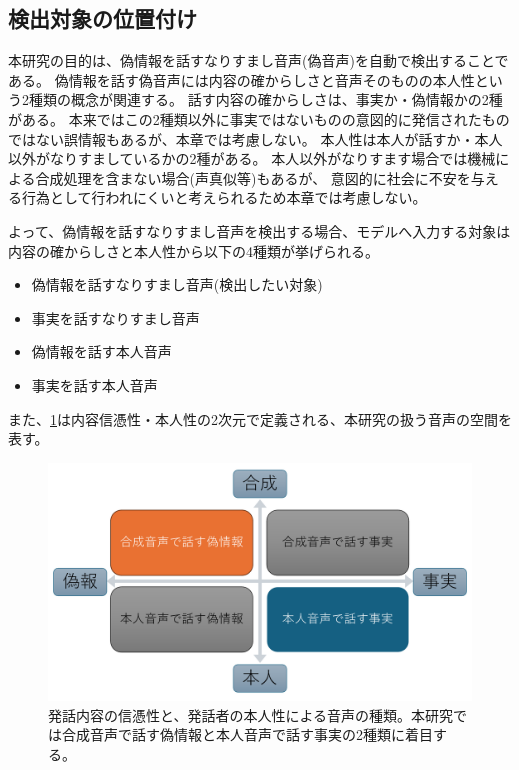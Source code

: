 \subsection{検出対象の位置付け}
本研究の目的は、偽情報を話すなりすまし音声(偽音声)を自動で検出することである。
偽情報を話す偽音声には内容の確からしさと音声そのものの本人性という2種類の概念が関連する。
話す内容の確からしさは、事実か・偽情報かの2種がある。
本来ではこの2種類以外に事実ではないものの意図的に発信されたものではない誤情報もあるが、本章では考慮しない。
本人性は本人が話すか・本人以外がなりすましているかの2種がある。
本人以外がなりすます場合では機械による合成処理を含まない場合(声真似等)もあるが、
意図的に社会に不安を与える行為として行われにくいと考えられるため本章では考慮しない。

よって、偽情報を話すなりすまし音声を検出する場合、モデルへ入力する対象は内容の確からしさと本人性から以下の4種類が挙げられる。

\begin{itemize}
    \item 偽情報を話すなりすまし音声(検出したい対象)
    \item 事実を話すなりすまし音声
    \item 偽情報を話す本人音声
    \item 事実を話す本人音声
\end{itemize}

また、\cref{fig:twoPerspective}は内容信憑性・本人性の2次元で定義される、本研究の扱う音声の空間を表す。

\begin{figure}[h]
    \centering
    \includegraphics[width=\linewidth]{figures/D論概念図.pdf}
    \caption{発話内容の信憑性と、発話者の本人性による音声の種類。本研究では合成音声で話す偽情報と本人音声で話す事実の2種類に着目する。}
    \label{fig:twoPerspective}
\end{figure}

